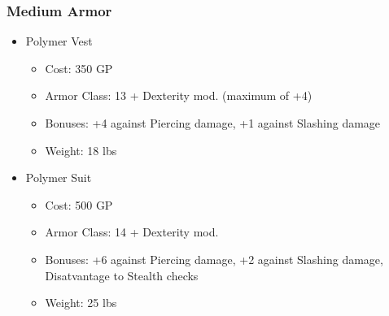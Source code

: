\documentclass[12pt, twoside]{article}
\begin{document}
\begin{FlushLeft}
\begin{multicols}{2}
			\subsubsection{Medium Armor}
			\begin{itemize}[wide]
				\item Polymer Vest
				\begin{itemize}
					\item Cost: 350 GP
					\item Armor Class: 13 + Dexterity mod. (maximum of +4)
					\item Bonuses: +4 against Piercing damage, +1 against Slashing damage
					\item Weight: 18 lbs
				\end{itemize}
				\item Polymer Suit
				\begin{itemize}
					\item Cost: 500 GP
					\item Armor Class: 14 + Dexterity mod.
					\item Bonuses: +6 against Piercing damage, +2 against Slashing damage, Disatvantage to Stealth checks
					\item Weight: 25 lbs
				\end{itemize}
			\end{itemize}
			\vfill


\end{multicols}
\end{FlushLeft}
\end{document}
